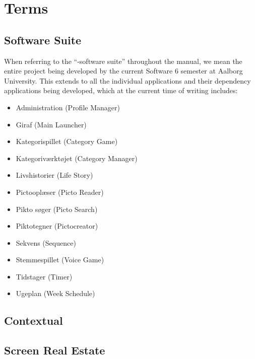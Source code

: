 
\chapter{Terms}

\section{\giraf Software Suite}
\noindent When referring to the ``\giraf-software suite'' throughout the manual, we mean the entire \giraf project being developed by the current Software 6 semester at Aalborg University. This extends to all the individual applications and their dependency applications being developed, which at the current time of writing includes: 

\begin{itemize}
    \item Administration (Profile Manager)
    \item Giraf (Main Launcher)
    \item Kategorispillet (Category Game)
    \item Kategoriværktøjet (Category Manager)
    \item Livshistorier (Life Story)
    \item Pictooplæser (Picto Reader)
    \item Pikto søger (Picto Search)
    \item Piktotegner (Pictocreator)
    \item Sekvens (Sequence)
    \item Stemmespillet (Voice Game)
    \item Tidstager (Timer)
    \item Ugeplan (Week Schedule)
\end{itemize}

\section{Contextual}


\section{Screen Real Estate}
